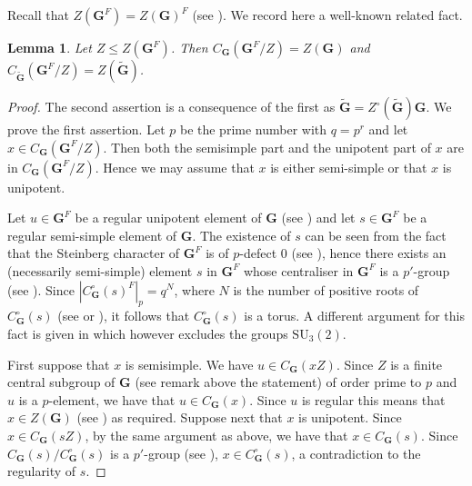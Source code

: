 \documentclass{amsart}
\theoremstyle{plain}\newtheorem{Theorem}{Theorem}[section]
\theoremstyle{plain}\newtheorem{Conjecture}[Theorem]{Conjecture}
\theoremstyle{plain}\newtheorem{Corollary}[Theorem]{Corollary}
\theoremstyle{plain}\newtheorem{Lemma}[Theorem]{Lemma}
\theoremstyle{plain}\newtheorem{Proposition}[Theorem]{Proposition}
\theoremstyle{definition}\newtheorem{Definition}[Theorem]{Definition}
\theoremstyle{definition}\newtheorem{Example}[Theorem]{Example}
\theoremstyle{definition}\newtheorem{Examples}[Theorem]{Examples}
\theoremstyle{definition}\newtheorem{Exercise}[Theorem]{Exercise}
\theoremstyle{definition}\newtheorem{Notation}[Theorem]{Notation}
\theoremstyle{definition}\newtheorem{Remark}[Theorem]{Remark}
\theoremstyle{definition}\newtheorem{Remarks}[Theorem]{Remarks}
\def\SU{\mathrm{SU}}
\newcommand{\bG}{{\mathbf{G}}}
\numberwithin{equation}{section}
\begin{document}
 Recall that  $Z(\bG^F)=Z(\bG)^F $ (see \cite[Prop. 3.6.8]{Carter}).  We  record here a well-known related fact.
\begin{Lemma}  Let $Z \leq  Z(\bG^F)$. Then $C_{\bG}(\bG^F/Z) = Z(\bG)$ and  $C_{\tilde \bG} (\bG^F/Z)=  Z(\tilde \bG)$.
 \end{Lemma}
\begin{proof} The second assertion is a consequence of the first  as $\tilde \bG = Z^{\circ}(\tilde \bG) \bG$.  We prove the first assertion.  Let $p$ be the prime number with $q=p^r$ and  let $x \in C_{\bG} (\bG^F/Z)$. Then  both the semisimple part and  the unipotent part of $x$  are in $C_{\bG} (\bG^F/Z)$.  Hence we may assume that $x$ is either semi-simple or that $x$ is unipotent. 

Let $u \in \bG^F$ be  a  regular unipotent element of $\bG$ (see  \cite[Prop.~5.1.7]{Carter})  and let  $ s \in \bG^F$ be a regular semi-simple element  of  $\bG$. The existence of  $s$  can be seen  from the fact that  the Steinberg character  of $\bG^F$   is of  $p$-defect $0$ (see \cite[Cor. 7.4.4]{DiMi}), hence there exists an (necessarily semi-simple)  element $s$ in $\bG^F$ whose  centraliser in  $\bG^F$ is a $p'$-group (see \cite[Thms.~6.2.1,~6.5.4]{LiBookII}). Since  $|C_{\bG}^{\circ}(s)^F|_p =  q^N$, where $N$ is the number of positive  roots of  $C_{\bG}^{\circ}(s) $ (see \cite[Props.~4.4.1,~4.4.2]{DiMi}  or \cite[Sec.~2.9]{Carter}), it follows that  $C_{\bG}^{\circ} (s)$  is a torus. A different argument for this fact  is given in \cite[Rem.~7.1.5]{DOR}   which   however excludes the groups $\SU_3(2)$.  

First suppose  that $x$ is  semisimple.   We have  $u \in C_{\bG} (xZ)$. Since  $Z$ is a finite central subgroup of $\bG$ (see remark above the statement) of order prime to $p$  and $u$ is a  $p$-element,  we  have that  $u \in C_{\bG}(x)$.  Since $u $ is regular this means that $ x \in Z(\bG)$  (see \cite[Prop.~5.1.5]{Carter})  as required. Suppose next that $x$ is  unipotent. Since $ x \in C_{\bG} (sZ)$, by the same argument as above, we have that  $x \in C_{\bG} (s)$. Since $C_{\bG}(s)/C_{\bG}^{\circ} (s)$ is a $p'$-group (see \cite[Prop.~3.5.3]{DiMi}),  $x  \in C_{\bG}^{\circ}(s) $,  a contradiction to the regularity of $s$.
 \end{proof}
 
 
 
\end{document}
